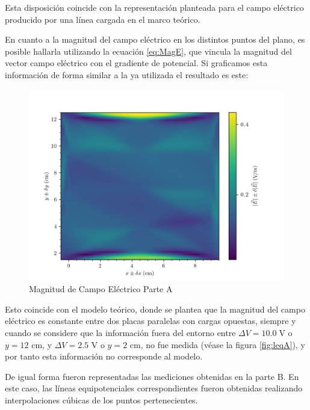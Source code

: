 \documentclass{article}
\begin{document}
Esta disposición coincide con la representación planteada para el campo eléctrico producido por una línea cargada en el marco teórico.

En cuanto a la magnitud del campo eléctrico en los distintos puntos del plano, es posible hallarla utilizando la ecuación \ref{eq:MagE}, que vincula la magnitud del vector campo eléctrico con el gradiente de potencial. Si graficamos esta información de forma similar a la ya utilizada el resultado es este:

\begin{figure}[H]
  \hspace{-0.1cm}\includegraphics[scale=0.12]{plot4.png}
  \caption{Magnitud de Campo Eléctrico Parte A}
\end{figure}

Esto coincide con el modelo teórico, donde se plantea que la magnitud del campo eléctrico es constante entre dos placas paralelas con cargas opuestas, siempre y cuando se considere que la información fuera del entorno entre $\Delta V = 10.0 \;\text{V}$ o ${y} = 12$ cm, y $\Delta V = 2.5$ V o $y = 2$ cm, no fue medida (véase la figura \ref{fig:leqA}), y por tanto esta información no corresponde al modelo.

De igual forma fueron representadas las mediciones obtenidas en la parte B. En este caso, las líneas equipotenciales correspondientes fueron obtenidas realizando interpolaciones cúbicas de los puntos pertenecientes.

\vfill

\vspace*{-2cm}
\end{document}
